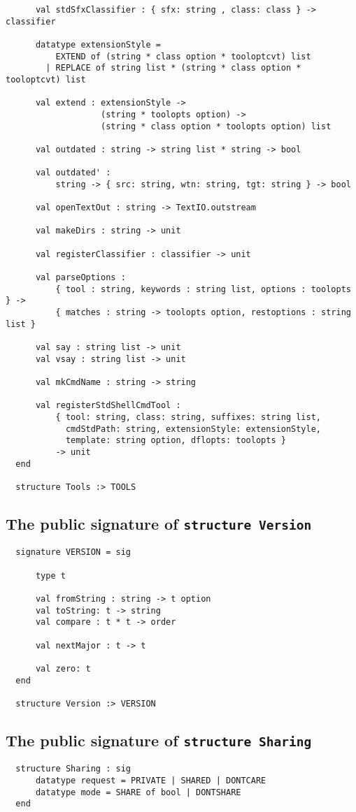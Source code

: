 \begin{small}
\begin{verbatim}
      val stdSfxClassifier : { sfx: string , class: class } -> classifier
  
      datatype extensionStyle =
          EXTEND of (string * class option * tooloptcvt) list
        | REPLACE of string list * (string * class option * tooloptcvt) list
  
      val extend : extensionStyle ->
                   (string * toolopts option) ->
                   (string * class option * toolopts option) list
  
      val outdated : string -> string list * string -> bool
  
      val outdated' :
          string -> { src: string, wtn: string, tgt: string } -> bool
  
      val openTextOut : string -> TextIO.outstream
  
      val makeDirs : string -> unit
  
      val registerClassifier : classifier -> unit
  
      val parseOptions :
          { tool : string, keywords : string list, options : toolopts } ->
          { matches : string -> toolopts option, restoptions : string list }
  
      val say : string list -> unit
      val vsay : string list -> unit
  
      val mkCmdName : string -> string
  
      val registerStdShellCmdTool :
          { tool: string, class: string, suffixes: string list,
            cmdStdPath: string, extensionStyle: extensionStyle,
            template: string option, dflopts: toolopts }
          -> unit
  end
  
  structure Tools :> TOOLS
\end{verbatim}
\end{small}

\subsection{The public signature of {\tt structure Version}}

\begin{small}
\begin{verbatim}
  signature VERSION = sig
  
      type t
  
      val fromString : string -> t option
      val toString: t -> string
      val compare : t * t -> order
  
      val nextMajor : t -> t
  
      val zero: t
  end
  
  structure Version :> VERSION
\end{verbatim}
\end{small}

\subsection{The public signature of {\tt structure Sharing}}

\begin{small}
\begin{verbatim}
  structure Sharing : sig
      datatype request = PRIVATE | SHARED | DONTCARE
      datatype mode = SHARE of bool | DONTSHARE
  end
\end{verbatim}
\end{small}
